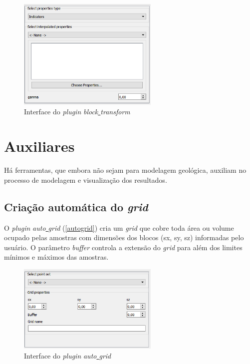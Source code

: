 \begin{figure}[H]
	\caption{\label{bltrans}Interface do \textit{plugin} \textit{block\underline{ }transform}}
	\centering
		\includegraphics[width=0.6\textwidth]{apendice/imagens/block_tr.PNG}
\end{figure}

\section{Auxiliares}

Há ferramentas, que embora não sejam para modelagem geológica, auxiliam no processo de modelagem e visualização dos resultados.

\subsection{Criação automática do \textit{grid}}

O \textit{plugin} \textit{auto\underline{ }grid} (\autoref{autogrid}) cria um \textit{grid} que cobre toda área ou volume ocupado pelas amostras com dimensões dos blocos (sx, sy, sz) informadas pelo usuário. O parâmetro \textit{buffer} controla a extensão do \textit{grid} para além dos limites mínimos e máximos das amostras.

\begin{figure}[H]
	\caption{\label{autogrid}Interface do \textit{plugin} \textit{auto\underline{ }grid}}
	\centering
		\includegraphics[width=0.6\textwidth]{apendice/imagens/autogrid.PNG}
\end{figure}

